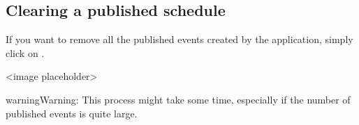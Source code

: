 \documentclass[letterpaper,10pt,english]{sphinxmanual}
\begin{document}
\subsection{Clearing a published schedule}
\label{\detokenize{index:clearing-a-published-schedule}}
If you want to remove all the published events created by the application,
simply click on .

\textless{}image placeholder\textgreater{}

\begin{sphinxadmonition}{warning}{Warning:}
This process might take some time, especially if the number of published
events is quite large.
\end{sphinxadmonition}



\renewcommand{\indexname}{Index}
\printindex
\end{document}
